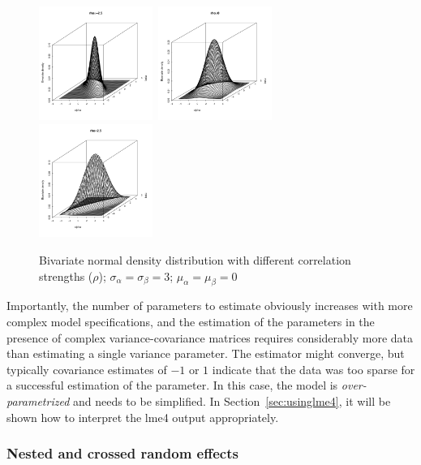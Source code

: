 \documentclass[a4paper,12pt]{article}
\begin{document}
\begin{figure}[!htpb]
  \centering
  \includegraphics[width=0.33\textwidth]{graphics/multnorm1}~\includegraphics[width=0.33\textwidth]{graphics/multnorm2}~\includegraphics[width=0.33\textwidth]{graphics/multnorm3}
  \caption{Bivariate normal density distribution with different correlation strengths ($\rho$); $\sigma_{\alpha}=\sigma_{\beta}=3$; $\mu_{\alpha}=\mu_{\beta}=0$}
  \label{fig:multnorm}
\end{figure}

Importantly, the number of parameters to estimate obviously increases with more complex model specifications, and the estimation of the parameters in the presence of complex variance-covariance matrices requires considerably more data than estimating a single variance parameter.
The estimator might converge, but typically covariance estimates of $-1$ or $1$ indicate that the data was too sparse for a successful estimation of the parameter.
In this case, the model is \textit{over-parametrized} and needs to be simplified.
In Section~\ref{sec:usinglme4}, it will be shown how to interpret the lme4 output appropriately.

\subsubsection{Nested and crossed random effects}
\label{sec:nestedandcrossedrandomeffects}
\end{document}
